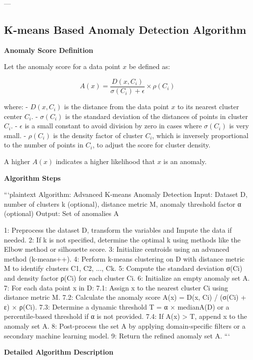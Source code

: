 \documentclass{sigkddExp}
\begin{document}
---


\subsection{K-means Based Anomaly Detection Algorithm}

\textbf{Anomaly Score Definition}

Let the anomaly score for a data point \( x \) be defined as:

\[
A(x) = \frac{D(x, C_i)}{\sigma(C_i) + \epsilon} \times \rho(C_i)
\]

where:
- \( D(x, C_i) \) is the distance from the data point \( x \) to its nearest cluster center \( C_i \).
- \( \sigma(C_i) \) is the standard deviation of the distances of points in cluster \( C_i \).
- \( \epsilon \) is a small constant to avoid division by zero in cases where \( \sigma(C_i) \) is very small.
- \( \rho(C_i) \) is the density factor of cluster \( C_i \), which is inversely proportional to the number of points in \( C_i \), to adjust the score for cluster density.

A higher \( A(x) \) indicates a higher likelihood that \( x \) is an anomaly.

\textbf{Algorithm Steps}

```plaintext
Algorithm: Advanced K-means Anomaly Detection
Input: Dataset D, number of clusters k (optional), distance metric M, anomaly threshold factor α (optional)
Output: Set of anomalies A

1: Preprocess the dataset D, transform the variables and Impute the data if needed.
2: If k is not specified, determine the optimal k using methods like the Elbow method or silhouette score.
3: Initialize centroids using an advanced method (k-means++).
4: Perform k-means clustering on D with distance metric M to identify clusters C1, C2, ..., Ck.
5: Compute the standard deviation σ(Ci) and density factor ρ(Ci) for each cluster Ci.
6: Initialize an empty anomaly set A.
7: For each data point x in D:
    7.1: Assign x to the nearest cluster Ci using distance metric M.
    7.2: Calculate the anomaly score A(x) = D(x, Ci) / (σ(Ci) + ε) × ρ(Ci).
    7.3: Determine a dynamic threshold T = α × median{A(D)} or a percentile-based threshold if α is not provided.
    7.4: If A(x) > T, append x to the anomaly set A.
8: Post-process the set A by applying domain-specific filters or a secondary machine learning model.
9: Return the refined anomaly set A.
```

\textbf{Detailed Algorithm Description}
\end{document}
